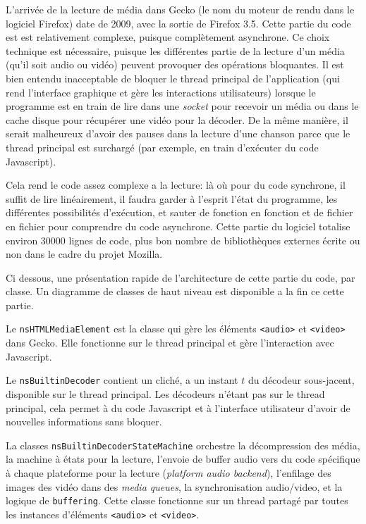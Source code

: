 \documentclass[a4paper,10pt]{article}
\newcommand{\cc}[1]{\texttt{#1}}
\begin{document}
\begin{multicols}{2}
  L'arrivée de la lecture de média dans Gecko (le nom du moteur de rendu dans le
  logiciel Firefox) date de 2009, avec la sortie de Firefox 3.5. Cette partie du
  code est est relativement complexe, puisque complètement asynchrone. Ce choix
  technique est nécessaire, puisque les différentes partie de la lecture d'un
  média (qu'il soit audio ou vidéo) peuvent provoquer des opérations bloquantes.
  Il est bien entendu inacceptable de bloquer le thread principal de
  l'application (qui rend l'interface graphique et gère les interactions
  utilisateurs) lorsque le programme est en train de lire dans une \emph{socket}
  pour recevoir un média ou dans le cache disque pour récupérer une vidéo pour
  la décoder. De la même manière, il serait malheureux d'avoir des pauses dans
  la lecture d'une chanson parce que le thread principal est surchargé (par
  exemple, en train d'exécuter du code Javascript).

  Cela rend le code assez complexe a la lecture: là où pour du code synchrone,
  il suffit de lire linéairement, il faudra garder à l'esprit l'état du
  programme, les différentes possibilités d'exécution, et sauter de
  fonction en fonction et de fichier en fichier pour comprendre du code
  asynchrone. Cette partie du logiciel totalise environ 30000 lignes de code,
  plus bon nombre de bibliothèques externes écrite ou non dans le cadre du
  projet Mozilla.

  Ci dessous, une présentation rapide de l'architecture de cette partie du code,
  par classe. Un diagramme de classes de haut niveau est disponible a la fin ce
  cette partie.

  Le \cc{nsHTMLMediaElement} est la classe qui gère les éléments \cc{<audio>} et
  \cc{<video>} dans Gecko. Elle fonctionne sur le thread principal et gère
  l'interaction avec Javascript.

  Le \cc{nsBuiltinDecoder} contient un cliché, a un instant $t$ du décodeur
  sous-jacent, disponible sur le thread principal.  Les décodeurs n'étant pas
  sur le thread principal, cela permet à du code Javascript et à l'interface
  utilisateur d'avoir de nouvelles informations sans bloquer.

  La classes \cc{nsBuiltinDecoderStateMachine} orchestre la décompression des
  média, la machine à états pour la lecture, l'envoie de buffer audio vers du
  code spécifique à chaque plateforme pour la lecture (\emph{platform audio
  backend}), l'enfilage des images des vidéo dans des \emph{media queues}, la
  synchronisation audio/video, et la logique de \cc{buffering}. Cette classe
  fonctionne sur un thread partagé par toutes les instances d'éléments
  \cc{<audio>} et \cc{<video>}.


\end{multicols}
\end{document}

